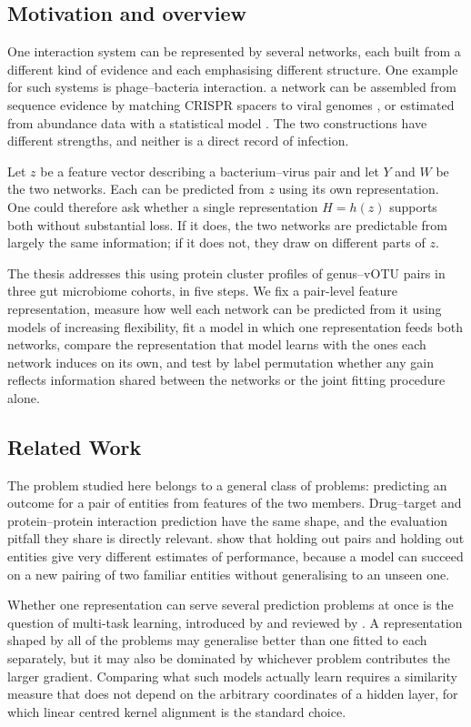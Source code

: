 \subsection{Motivation and overview}
\label{intro:overview}
One interaction system can be represented by several networks, each built from a different kind of
evidence and each emphasising different structure. One example for such systems is phage--bacteria interaction. a
network can be assembled from sequence evidence by matching CRISPR spacers to viral genomes
\citep{edwards2016}, or estimated from abundance data with a statistical model \citep{kurtz2015}. The two
constructions have different strengths, and neither is a direct record of infection.

Let \(z\) be a feature
vector describing a bacterium--virus pair and let \(Y\) and \(W\) be the two networks. Each can be
predicted from \(z\) using its own representation. One could therefore ask whether a single
representation \(H=h(z)\) supports both without substantial loss. If it does, the two networks are
predictable from largely the same information; if it does not, they draw on different parts of \(z\).

The thesis addresses this using protein cluster profiles of genus--vOTU pairs in three gut microbiome
cohorts, in five steps. We fix a pair-level feature representation, measure how well each network can be
predicted from it using models of increasing flexibility, fit a model in which one representation feeds
both networks, compare the representation that model learns with the ones each network induces on its
own, and test by label permutation whether any gain reflects information shared between the networks or
the joint fitting procedure alone.

\subsection{Related Work}
The problem studied here belongs to a general class of problems: predicting an outcome for a pair of
entities from features of the two members. Drug--target and protein--protein interaction prediction have the same shape,
and the evaluation pitfall they share is directly relevant. \citet{park2012} show that holding out pairs
and holding out entities give very different estimates of performance, because a model can succeed on a
new pairing of two familiar entities without generalising to an unseen one.

Whether one representation can serve several prediction problems at once is the question of multi-task
learning, introduced by \citet{caruana1997} and reviewed by \citet{ruder2017}. A representation shaped by
all of the problems may generalise better than one fitted to each separately, but it may also be dominated
by whichever problem contributes the larger gradient. Comparing what such models actually learn requires a similarity measure that does not depend on
the arbitrary coordinates of a hidden layer, for which linear centred kernel alignment
\citep{kornblith2019} is the standard choice.

